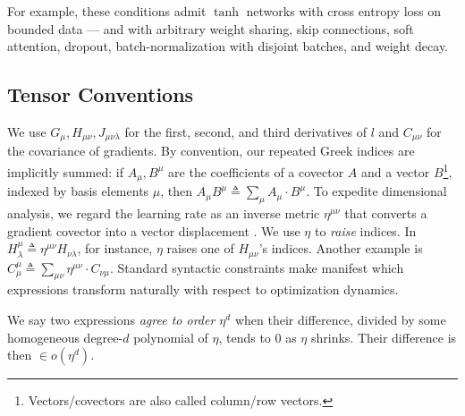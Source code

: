 \documentclass{article}
\begin{document}
        For example, these conditions admit $\tanh$ networks with cross entropy
        loss on bounded data --- and with arbitrary weight sharing, skip
        connections, soft attention, dropout, batch-normalization with disjoint
        batches, and weight decay.
        

    \subsection{Tensor Conventions}
        We use $G_\mu, H_{\mu\nu}, J_{\mu\nu\lambda}$ for the first, second,
        and third derivatives of $l$ and $C_{\mu \nu}$ for the covariance of
        gradients.  By convention, our repeated Greek indices are implicitly
        summed: if $A_\mu, B^\mu$ are the coefficients of a covector $A$ and a
        vector
        $B$\footnote{
            Vectors/covectors are also called column/row vectors.
        }, indexed by basis elements $\mu$, then
        $
            A_\mu B^\mu
            \triangleq
            \sum_\mu A_\mu \cdot B^\mu
        $.
        To expedite dimensional analysis, we regard the learning rate as an
        inverse metric $\eta^{\mu\nu}$ that converts a gradient covector into a
        vector displacement \citep{bo13}.  We use $\eta$ to \emph{raise}
        indices.  In
        $
            H^{\mu}_{\lambda}
            \triangleq
            \eta^{\mu\nu} H_{\nu\lambda}
        $, for instance,
        $\eta$ raises one of $H_{\mu\nu}$'s indices.  Another example is
        $
            C^{\mu}_{\mu}
            \triangleq
            \sum_{\mu \nu} \eta^{\mu\nu} \cdot C_{\nu\mu}
        $.
        Standard syntactic constraints make manifest which expressions
        transform naturally with respect to optimization dynamics.  

        We say two expressions \emph{agree to order $\eta^d$} when
        their difference, divided by some homogeneous degree-$d$
        polynomial of $\eta$, tends to $0$ as $\eta$ shrinks.  Their
        difference is then $\in o(\eta^d)$.

\end{document}
